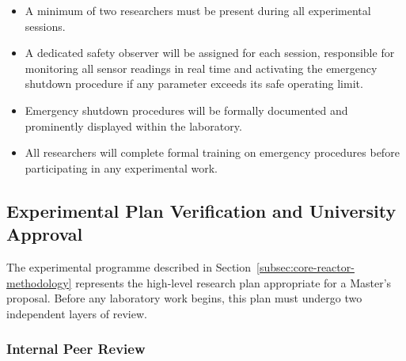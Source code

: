 \documentclass[12pt]{article}
\begin{document}
\begin{itemize}[itemsep=4pt]
    \item A minimum of two researchers must be present during all experimental
          sessions.
    \item A dedicated safety observer will be assigned for each session, responsible
          for monitoring all sensor readings in real time and activating the emergency
          shutdown procedure if any parameter exceeds its safe operating limit.
    \item Emergency shutdown procedures will be formally documented and prominently
          displayed within the laboratory.
    \item All researchers will complete formal training on emergency procedures
          before participating in any experimental work.
\end{itemize}

\subsection{Experimental Plan Verification and University Approval}

The experimental programme described in Section~\ref{subsec:core-reactor-methodology} represents the high-level
research plan appropriate for a Master's proposal. Before any laboratory work begins,
this plan must undergo two independent layers of review.

\subsubsection{Internal Peer Review}
\end{document}
